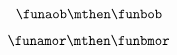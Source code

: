 \begin{forslides}
        \begin{equation}
            \label{eq:cats-of-structures-09}
            \funaob \mthen \funbob
        \end{equation}

        \begin{equation}
            \label{eq:cats-of-structures-10}
            \funamor \mthen \funbmor
        \end{equation}

%
%
%
%        
%
%
%
%
%

\end{forslides}
